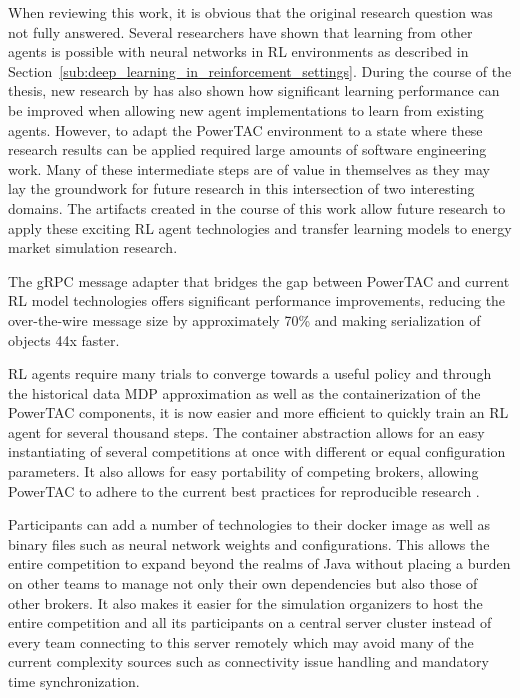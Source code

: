 When reviewing this work, it is obvious that the original research question was not fully answered. Several researchers
have shown that learning from other agents is possible with neural networks in \ac{RL} environments as described in
Section~\ref{sub:deep_learning_in_reinforcement_settings}. During the course of the thesis, new research by
\citet{schmitt2018kickstarting}  has also shown how significant learning performance can be improved when allowing new
agent implementations to learn from existing agents.
However, to adapt the \ac{PowerTAC} environment to a state where these research results can be applied required large
amounts of software engineering work. Many of these intermediate steps are of value in themselves as they may lay the
groundwork for future research in this intersection of two interesting domains. The artifacts created in the course of
this work allow future research to apply these exciting \ac{RL} agent technologies and transfer learning
models to energy market simulation research.

The \ac{gRPC} message adapter that bridges the gap between \ac{PowerTAC} and current \ac{RL} model technologies offers
significant performance improvements, reducing the over-the-wire message size by approximately 70\% and making serialization of objects 44x
faster.

\ac{RL} agents require many trials to converge towards a useful policy and through the historical data \ac{MDP}
approximation as well as the containerization of the \ac{PowerTAC} components, it is now easier and more efficient
to quickly train an \ac{RL} agent for several thousand steps. The container abstraction allows for an easy instantiating
of several competitions at once with different or equal configuration parameters. It also allows for easy portability of
competing brokers, allowing \ac{PowerTAC} to adhere to the current best practices for reproducible research \citep{boettiger2015introduction}.

Participants can add a number of technologies to their docker image as well as binary files such as neural network weights and
configurations. This allows the entire competition to expand beyond the realms of Java without placing a burden on other
teams to manage not only their own dependencies but also those of other brokers. It also makes it easier for the simulation
organizers to host the entire competition and all its participants on a central server cluster instead of every team connecting to
this server remotely which may avoid many of the current complexity sources such as connectivity issue handling and mandatory
time synchronization.

